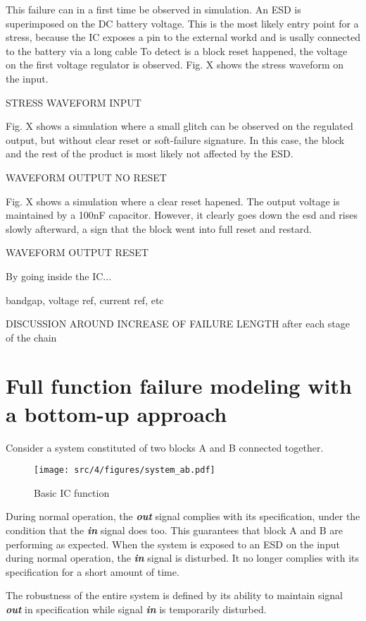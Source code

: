 This failure can in a first time be observed in simulation.
An \gls{ESD} is superimposed on the DC battery voltage.
This is the most likely entry point for a stress, because the \gls{IC} exposes a pin to the external workd and is usally connected to the battery via a long cable
To detect is a block reset happened, the voltage on the first voltage regulator is observed.
Fig. X shows the stress waveform on the input.

STRESS WAVEFORM INPUT

Fig. X shows a simulation where a small glitch can be observed on the regulated output, but without clear reset or soft-failure signature.
In this case, the block and the rest of the product is most likely not affected by the ESD.

WAVEFORM OUTPUT NO RESET

Fig. X shows a simulation where a clear reset hapened.
The output voltage is maintained by a 100nF capacitor.
However, it clearly goes down  the \gls{esd} and rises slowly afterward, a sign that the block went into full reset and restard.

WAVEFORM OUTPUT RESET

By going inside the \gls{IC}...

bandgap, voltage ref, current ref, etc

DISCUSSION AROUND INCREASE OF FAILURE LENGTH after each stage of the chain

\section{Full function failure modeling with a bottom-up approach}

Consider a system constituted of two blocks A and B connected together.

\begin{figure}[h]
  \centering
  \texttt{[image: src/4/figures/system\_ab.pdf]}
  \caption{Basic IC function}
  \label{basic_ic_function}
\end{figure}

During normal operation, the \textbf{\textit{out}} signal complies with its specification,
under the condition that the \textbf{\textit{in}} signal does too.
This guarantees that block A and B are performing as expected.
When the system is exposed to an ESD on the input during normal operation, the \textbf{\textit{in}} signal is disturbed.
It no longer complies with its specification for a short amount of time.

The robustness of the entire system is defined by its ability to maintain signal \textbf{\textit{out}} in specification
while signal \textbf{\textit{in}} is temporarily disturbed.

